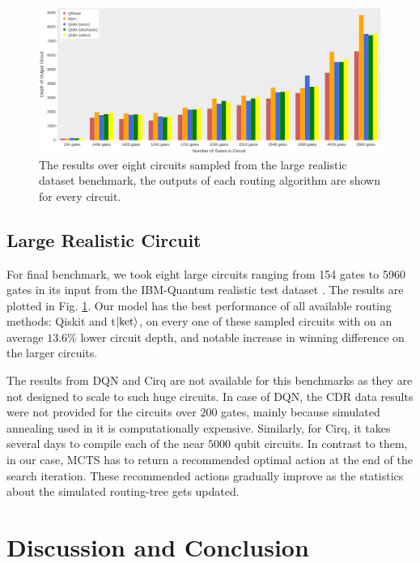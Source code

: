 \documentclass[%
 reprint,
amsmath,amssymb,
pra,
]{revtex4-2}
\begin{document}
\begin{figure}[ht]
    \includegraphics[width=0.935\linewidth]{images/realistic_large_benchmark.pdf}
    \caption{\label{fig:results-large}
        The results over eight circuits sampled from the large realistic dataset benchmark, the outputs of each routing algorithm are shown for every circuit.}
\end{figure}

\subsection{\label{sec:results-realistic}Large Realistic Circuit}

For final benchmark, we took eight large circuits ranging from 154 gates to 5960 gates in its input from the IBM-Quantum realistic test dataset \citep{data_realistic}. The results are plotted in Fig.  \ref{fig:results-large}. Our model has the best performance of all available routing methods: Qiskit and t$\ket{\text{ket}}$, on every one of these sampled circuits with on an average $13.6\%$ lower circuit depth, and notable increase in winning difference on the larger circuits.

The results from DQN and Cirq are not available for this benchmarks as they are not designed to scale to such huge circuits. In case of DQN, the CDR data results were not provided for the circuits over $200$ gates, mainly because simulated annealing used in it is computationally expensive. Similarly, for Cirq, it takes several days to compile each of the near $5000$ qubit circuits. In contrast to them, in our case, MCTS has to return a recommended optimal action at the end of the search iteration. These recommended actions gradually improve as the statistics about the simulated routing-tree gets updated. 

\section{\label{sec:discussion-conclusion}Discussion and Conclusion}
\end{document}
